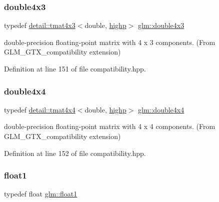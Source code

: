 \subsubsection{\texorpdfstring{double4x3}{double4x3}}
{\footnotesize\ttfamily typedef \hyperlink{structglm_1_1detail_1_1tmat4x3}{detail\+::tmat4x3}$<$double, \hyperlink{namespaceglm_a0f04f086094c747d227af4425893f545ac6f7eab42eacbb10d59a58e95e362074}{highp}$>$ \hyperlink{group__gtx__compatibility_ga1199ee41226db53d5f190d0628041845}{glm\+::double4x3}}



double-\/precision floating-\/point matrix with 4 x 3 components. (From G\+L\+M\+\_\+\+G\+T\+X\+\_\+compatibility extension) 



Definition at line 151 of file compatibility.\+hpp.

\mbox{\label{group__gtx__compatibility_ga95e88bfe8dea34a6d4b30b1029c3e2da}} 
\subsubsection{\texorpdfstring{double4x4}{double4x4}}
{\footnotesize\ttfamily typedef \hyperlink{structglm_1_1detail_1_1tmat4x4}{detail\+::tmat4x4}$<$double, \hyperlink{namespaceglm_a0f04f086094c747d227af4425893f545ac6f7eab42eacbb10d59a58e95e362074}{highp}$>$ \hyperlink{group__gtx__compatibility_ga95e88bfe8dea34a6d4b30b1029c3e2da}{glm\+::double4x4}}



double-\/precision floating-\/point matrix with 4 x 4 components. (From G\+L\+M\+\_\+\+G\+T\+X\+\_\+compatibility extension) 



Definition at line 152 of file compatibility.\+hpp.

\mbox{\label{group__gtx__compatibility_gae0ad1b0450320cda98bbbecb56bc3167}} 
\subsubsection{\texorpdfstring{float1}{float1}}
{\footnotesize\ttfamily typedef float \hyperlink{group__gtx__compatibility_gae0ad1b0450320cda98bbbecb56bc3167}{glm\+::float1}}



